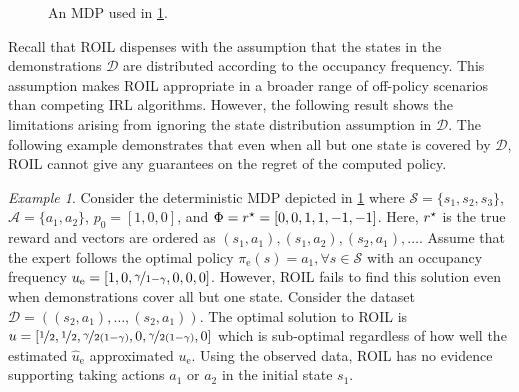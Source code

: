 \documentclass[10pt]{article}
\theoremstyle{plain}
\theoremstyle{remark}
\newtheorem{example}{Example}
\begin{document}
\begin{figure}
  \centering
{}
  \caption{An MDP used in \cref{exm:roil-limitations}.}
  \label{fig:roil-fail}
\end{figure}

Recall that ROIL dispenses with the assumption that the states in the demonstrations $\mathcal{D}$ are distributed according to the occupancy frequency. This assumption makes ROIL appropriate in a broader range of off-policy scenarios than competing IRL algorithms. However, the following result shows the limitations arising from ignoring the state distribution assumption in $\mathcal{D}$. The following example demonstrates that even when all but one state is covered by $\mathcal{D}$, ROIL cannot give any guarantees on the regret of the computed policy. 

\begin{example} \label{exm:roil-limitations}
Consider the deterministic MDP depicted in \cref{fig:roil-fail} where $\mathcal{S} = \{s_1, s_2, s_3\}$, $\mathcal{A} = \{a_1, a_2\}$, $p_0 = [1,0,0]$, and $\Phi = r^{\mathnormal{\star}} = [0,0,1,1,-1,-1]$. Here, $r^{\mathnormal{\star}}$ is the true reward and vectors are ordered as $(s_1,a_1), (s_1, a_2), (s_2,a_1), \dots $. Assume that the expert follows the optimal policy $\pi_{\mathrm{e}}(s) = a_1, \forall s\in \mathcal{S}$ with an occupancy frequency $u_{\mathrm{e}} = [1,0,\nicefrac{\gamma}{1-\gamma},0,0,0]$. However, ROIL fails to find this solution even when demonstrations cover all but one state. Consider the dataset $\mathcal{D} = ((s_2, a_1),  \dots, (s_2, a_1))$. The optimal solution to ROIL is $u = [\nicefrac{1}{2},\nicefrac{1}{2},\nicefrac{\gamma}{2(1-\gamma)},0,\nicefrac{\gamma}{2(1-\gamma)},0]$ which is sub-optimal regardless of how well the estimated $\hat{u}_{\mathrm{e}}$ approximated $u_{\mathrm{e}}$. Using the observed data, ROIL has no evidence supporting taking actions $a_1$ or $a_2 $ in the initial state $s_1$.
\end{example} 
\end{document}
